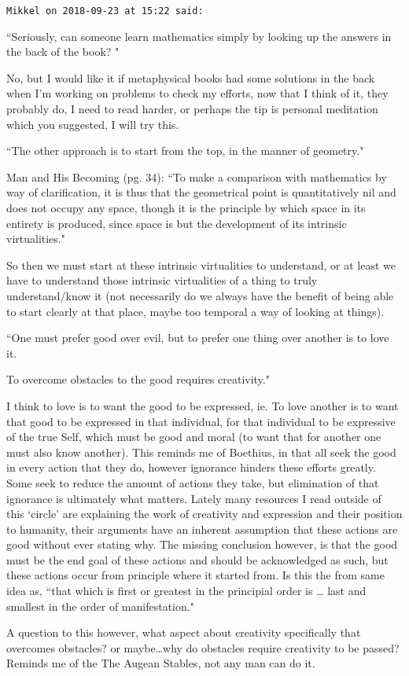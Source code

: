 \begin{footnotesize}\begin{sffamily}



\texttt{Mikkel on 2018-09-23 at 15:22 said: }

``Seriously, can someone learn mathematics simply by looking up the answers in the back of the book? "

No, but I would like it if metaphysical books had some solutions in the back when I'm working on problems to check my efforts, now that I think of it, they probably do, I need to read harder, or perhaps the tip is personal meditation which you suggested, I will try this.

``The other approach is to start from the top, in the manner of geometry."

Man and His Becoming (pg. 34): ``To make a comparison with mathematics by way of clarification, it is thus that the geometrical point is quantitatively nil and does not occupy any space, though it is the principle by which space in its entirety is produced, since space is but the development of its intrinsic virtualities."

So then we must start at these intrinsic virtualities to understand, or at least we have to understand those intrinsic virtualities of a thing to truly understand/know it (not necessarily do we always have the benefit of being able to start clearly at that place, maybe too temporal a way of looking at things).

``One must prefer good over evil, but to prefer one thing over another is to love it.

To overcome obstacles to the good requires creativity." 

I think to love is to want the good to be expressed, ie. To love another is to want that good to be expressed in that individual, for that individual to be expressive of the true Self, which must be good and moral (to want that for another one must also know another). This reminds me of Boethius, in that all seek the good in every action that they do, however ignorance hinders these efforts greatly. Some seek to reduce the amount of actions they take, but elimination of that ignorance is ultimately what matters. Lately many resources I read outside of this `circle' are explaining the work of creativity and expression and their position to humanity, their arguments have an inherent assumption that these actions are good without ever stating why. The missing conclusion however, is that the good must be the end goal of these actions and should be acknowledged as such, but these actions occur from principle where it started from. Is this the from same idea as, ``that which is first or greatest in the principial order is … last and smallest in the order of manifestation."

A question to this however, what aspect about creativity specifically that overcomes obstacles? or maybe…why do obstacles require creativity to be passed? Reminds me of the The Augean Stables, not any man can do it.


\end{sffamily}\end{footnotesize}
